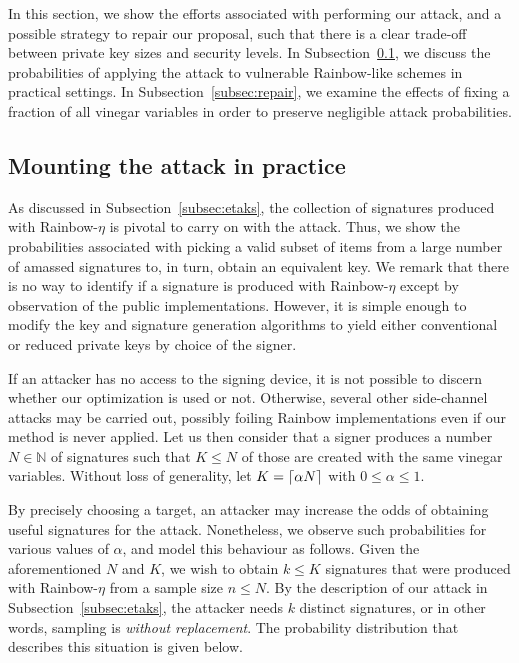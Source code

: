 \documentclass[12pt, a4paper, oneside]{memoir}
\DeclarePairedDelimiter{\ceil}{\lceil}{\rceil}
\theoremstyle{definition}
\begin{document}
In this section, we show the efforts associated with performing our attack, and a possible strategy to repair our proposal, such that there is a clear trade-off between private key sizes and security levels. In Subsection~\ref{subsec:mount}, we discuss the probabilities of applying the attack to vulnerable Rainbow-like schemes in practical settings. In Subsection~\ref{subsec:repair}, we examine the effects of fixing a fraction of all vinegar variables in order to preserve negligible attack probabilities.

\subsection{Mounting the attack in practice}\label{subsec:mount}

As discussed in Subsection~\ref{subsec:etaks}, the collection of signatures produced with Rainbow-$\eta$ is pivotal to carry on with the attack. Thus, we show the probabilities associated with picking a valid subset of items from a large number of amassed signatures to, in turn, obtain an equivalent key. We remark that there is no way to identify if a signature is produced with Rainbow-$\eta$ except by observation of the public implementations. However, it is simple enough to modify the key and signature generation algorithms to yield either conventional or reduced private keys by choice of the signer. 

If an attacker has no access to the signing device, it is not possible to discern whether our optimization is used or not. Otherwise, several other side-channel attacks may be carried out, possibly foiling Rainbow implementations even if our method is never applied. Let us then consider that a signer produces a number $N \in \mathbb{N}$ of signatures such that $K \leq N$ of those are created with the same vinegar variables. Without loss of generality, let $K = \ceil{\alpha N}$ with $0 \leq \alpha \leq 1$.

By precisely choosing a target, an attacker may increase the odds of obtaining useful signatures for the attack. Nonetheless, we observe such probabilities for various values of $\alpha$, and model this behaviour as follows. Given the aforementioned $N$ and $K$, we wish to obtain $k \leq K$ signatures that were produced with Rainbow-$\eta$ from a sample size $n \leq N$. By the description of our attack in Subsection~\ref{subsec:etaks}, the attacker needs $k$ distinct signatures, or in other words, sampling is \emph{without replacement}. The probability distribution that describes this situation is given below.
\end{document}
